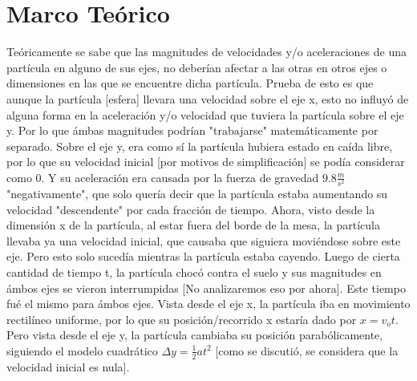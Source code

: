 \documentclass[osajnl,twocolumn,showpacs,superscriptaddress,10pt]{revtex4-1}
\begin{document}
\section{Marco Teórico}
Teóricamente se sabe que las magnitudes de velocidades y/o aceleraciones de una partícula en alguno de sus ejes, no deberían afectar a las otras en otros ejes o dimensiones en las que se encuentre dicha partícula. Prueba de esto es que aunque la partícula [esfera] llevara una velocidad sobre el eje x, esto no influyó de alguna forma en la aceleración y/o velocidad que tuviera la partícula sobre el eje y. Por lo que ámbas magnitudes podrían "trabajarse" matemáticamente por separado. Sobre el eje y, era como sí la partícula hubiera estado en caída libre, por lo que su velocidad inicial [por motivos de simplificación] se podía considerar como 0. Y su aceleración era causada por la fuerza de gravedad $ 9.8 \frac{m}{s^2}$ "negativamente", que solo quería decir que la partícula estaba aumentando su velocidad "descendente" por cada fracción de tiempo. Ahora, visto desde la dimensión x de la partícula, al estar fuera del borde de la mesa, la partícula llevaba ya una velocidad inicial, que causaba que siguiera moviéndose sobre este eje. Pero esto solo sucedía mientras la partícula estaba cayendo. Luego de cierta cantidad de tiempo t, la partícula chocó contra el suelo y sus magnitudes en ámbos ejes se vieron interrumpidas [No analizaremos eso por ahora]. Este tiempo fué el mismo para ámbos ejes. Vista desde el eje x, la partícula iba en movimiento rectilíneo uniforme, por lo que su posición/recorrido x estaría dado por $ x = v_ot$. Pero vista desde el eje y, la partícula cambiaba su posición parabólicamente, siguiendo el modelo cuadrático $ \Delta y = \frac{1}{2}at^2$ [como se discutió, se considera que la velocidad inicial es nula].
\end{document}
